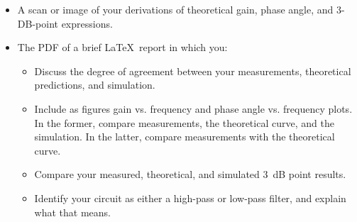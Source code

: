 \documentclass[11pt]{article}
\begin{document}
\begin{itemize}
\item A scan or image of your derivations of theoretical gain,
  phase angle, and 3-DB-point expressions. 

\item The PDF of a brief \LaTeX\ report in which you:
  \begin{itemize}
    \item Discuss the degree of agreement between your
      measurements, theoretical predictions, and simulation.

    \item Include as figures gain vs. frequency and phase angle
      vs. frequency plots. In the former, compare measurements, the
      theoretical curve, and the simulation. In the latter, compare
      measurements with the theoretical curve.

    \item Compare your measured, theoretical, and simulated 3~dB
      point results.

    \item Identify your circuit as either a high-pass or low-pass
      filter, and explain what that means.
  \end{itemize}
\end{itemize}
\end{document}
